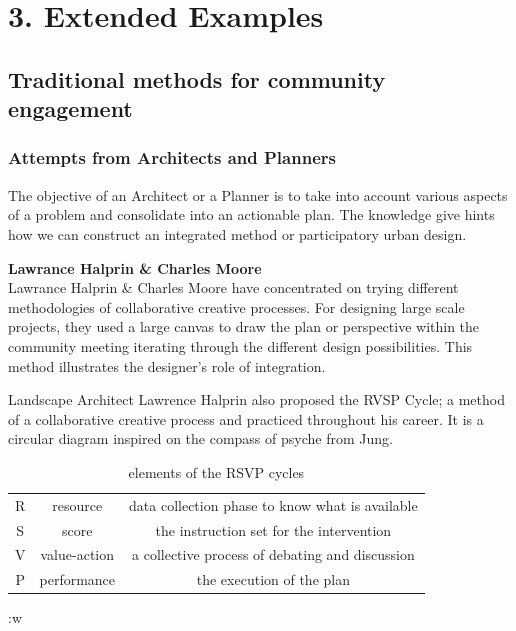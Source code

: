 \justify
\chapter{3. Extended Examples}

\section{Traditional methods for community engagement}

\subsection{Attempts from Architects and Planners}

The objective of an Architect or a Planner is to take into account various
aspects of a problem and consolidate into an actionable plan.
The knowledge give hints how we can construct an integrated method or
participatory urban design.

\textbf{Lawrance Halprin & Charles Moore} \\
Lawrance Halprin & Charles Moore have concentrated on trying different methodologies of collaborative creative processes.
For designing large scale projects, they used a large canvas to draw the
plan or perspective within the community meeting iterating through the
different design possibilities. This method illustrates the designer's role
of integration.

Landscape Architect Lawrence Halprin also proposed the RVSP Cycle; a method
of a collaborative creative process and practiced throughout his career. It
is a circular diagram inspired on the compass of psyche from Jung.

\begin{table}
  \centering
  \begin{tabular}{c|c|c}
    R & resource & data collection phase to know what is available \\
    S & score & the instruction set for the intervention \\
    V & value-action & a collective process of debating and discussion \\
    P & performance & the execution of the plan \\
  \end{tabular}
  \caption{elements of the RSVP cycles}
  \label{tab:rvsp}
\end{table}:w

